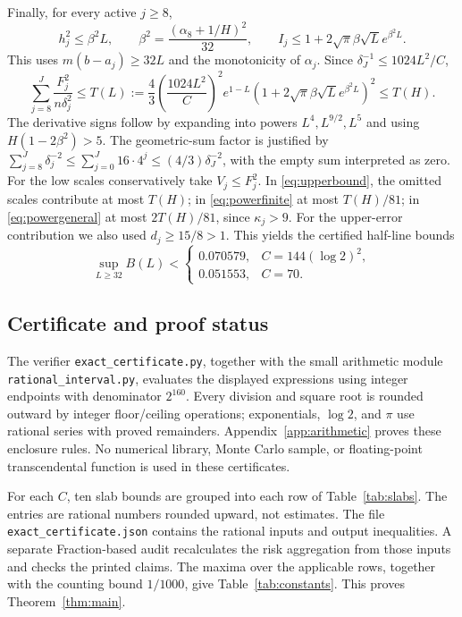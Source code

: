 \documentclass[10pt]{article}
\begin{document}
Finally, for every active $j\ge8$,
\[
 h_j^2\le\beta^2L,\qquad
 \beta^2=\frac{(\alpha_8+1/H)^2}{32},\qquad
 I_j\le1+2\sqrt\pi\beta\sqrt L e^{\beta^2L}.
\]
This uses $m(b-a_j)\ge32L$ and the monotonicity of $\alpha_j$.
Since $\delta_J^{-1}\le1024L^2/C$,
\begin{equation}\label{eq:tail}
 \sum_{j=8}^J\frac{F_j^2}{n\delta_j^2}
 \le T(L):=\frac43\left(\frac{1024L^2}{C}\right)^2
 e^{1-L}\left(1+2\sqrt\pi\beta\sqrt L e^{\beta^2L}\right)^2
 \le T(H).
\end{equation}
The derivative signs follow by expanding into powers $L^4,L^{9/2},L^5$
and using $H(1-2\beta^2)>5$.
The geometric-sum factor is justified by
$\sum_{j=8}^J\delta_j^{-2}\le\sum_{j=0}^J16\cdot4^j
\le(4/3)\delta_J^{-2}$, with the empty sum interpreted as zero.
For the low scales conservatively take $V_j\le F_j^2$.
In \eqref{eq:upperbound}, the omitted scales contribute at most $T(H)$;
in \eqref{eq:powerfinite} at most $T(H)/81$; in
\eqref{eq:powergeneral} at most $2T(H)/81$, since $\kappa_j>9$.
For the upper-error contribution we also used $d_j\ge15/8>1$.
This yields the certified half-line bounds
\[
 \sup_{L\ge32}B(L)<
 \begin{cases}
 0.070579,&C=144(\log2)^2,\\
 0.051553,&C=70.
 \end{cases}
\]

\subsection{Certificate and proof status}
The verifier \texttt{exact\_certificate.py}, together with the small arithmetic
module \texttt{rational\_interval.py}, evaluates the displayed expressions
using integer endpoints with denominator $2^{160}$. Every division and
square root is rounded outward by integer floor/ceiling operations;
exponentials, $\log2$, and $\pi$ use rational series with proved remainders.
Appendix~\ref{app:arithmetic} proves these enclosure rules. No numerical
library, Monte Carlo sample, or floating-point transcendental function is
used in these certificates.

For each $C$, ten slab bounds are grouped into each row of
Table~\ref{tab:slabs}. The entries are rational numbers rounded upward,
not estimates. The file \texttt{exact\_certificate.json} contains the rational
inputs and output inequalities. A separate Fraction-based audit
recalculates the risk aggregation from those inputs and checks the printed
claims. The maxima over the applicable rows, together with the counting
bound $1/1000$, give Table~\ref{tab:constants}. This proves
Theorem~\ref{thm:main}.
\end{document}

